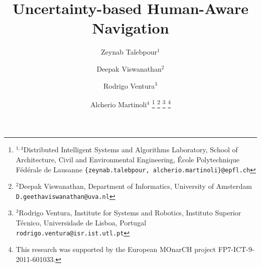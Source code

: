 \documentclass[letterpaper, 10 pt, conference]{ieeeconf}  %
\title{Uncertainty-based Human-Aware Navigation}
\author{Zeynab Talebpour$^{1}$ \and Deepak Viswanathan$^{2}$ \and Rodrigo Ventura$^{3}$ \and Alcherio Martinoli$^{4}$%
\thanks{$^{1,4}$Distributed Intelligent Systems and Algorithms Laboratory,
School of Architecture, Civil and Environmental Engineering,
 \'Ecole Polytechnique F\'ed\'erale de Lausanne 
        {\tt\small \{zeynab.talebpour, alcherio.martinoli\}@epfl.ch}}%
\thanks{$^{2}$Deepak Viswanathan, Department of Informatics, University of Amsterdam
        {\tt\small D.geethaviswanathan@uva.nl}}%
\thanks{$^{3}$Rodrigo Ventura, Institute for Systems and Robotics, Instituto Superior T\'ecnico, Universidade de Lisboa, Portugal
        {\tt\small  rodrigo.ventura@isr.ist.utl.pt}}%
\thanks{This research was supported by the European MOnarCH project FP7-ICT-9-2011-601033.}%
}
\begin{document}
\maketitle
\thispagestyle{empty}
\pagestyle{empty}


\begin{abstract}


\end{abstract}









%











\end{document}
